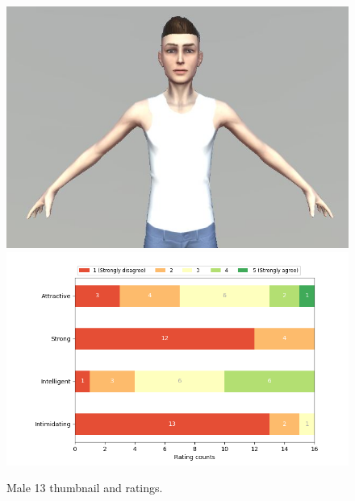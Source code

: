 \begin{figure}[H]
  \includegraphics[width=\linewidth]{Images/Males/13.JPG}
\endminipage\hfill
{}
  \includegraphics[width=\linewidth]{Survey/MRatings/avatar_m13.png}
\endminipage\hfill
\caption{Male 13 thumbnail and ratings.}
\end{figure}


